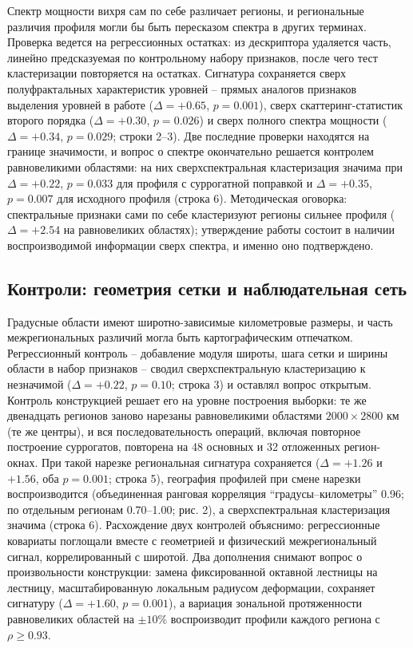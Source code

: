 \documentclass[12pt,a4paper]{article}
\begin{document}
Спектр мощности вихря сам по себе различает регионы, и региональные различия профиля могли бы быть пересказом спектра в других терминах. Проверка ведется на регрессионных остатках: из дескриптора удаляется часть, линейно предсказуемая по контрольному набору признаков, после чего тест кластеризации повторяется на остатках. Сигнатура сохраняется сверх полуфрактальных характеристик уровней -- прямых аналогов признаков выделения уровней в работе \cite{Krenke2019} ($\Delta = +0.65$, $p = 0.001$), сверх скаттеринг-статистик второго порядка \cite{Cheng2024} ($\Delta = +0.30$, $p = 0.026$) и сверх полного спектра мощности ($\Delta = +0.34$, $p = 0.029$; строки 2--3). Две последние проверки находятся на границе значимости, и вопрос о спектре окончательно решается контролем равновеликими областями: на них сверхспектральная кластеризация значима при $\Delta = +0.22$, $p = 0.033$ для профиля с суррогатной поправкой и $\Delta = +0.35$, $p = 0.007$ для исходного профиля (строка 6). Методическая оговорка: спектральные признаки сами по себе кластеризуют регионы сильнее профиля ($\Delta = +2.54$ на равновеликих областях); утверждение работы состоит в наличии воспроизводимой информации сверх спектра, и именно оно подтверждено.

\subsection{Контроли: геометрия сетки и наблюдательная сеть}

Градусные области имеют широтно-зависимые километровые размеры, и часть межрегиональных различий могла быть картографическим отпечатком. Регрессионный контроль -- добавление модуля широты, шага сетки и ширины области в набор признаков -- сводил сверхспектральную кластеризацию к незначимой ($\Delta = +0.22$, $p = 0.10$; строка 3) и оставлял вопрос открытым. Контроль конструкцией решает его на уровне построения выборки: те же двенадцать регионов заново нарезаны равновеликими областями $2000 \times 2800$ км (те же центры), и вся последовательность операций, включая повторное построение суррогатов, повторена на 48 основных и 32 отложенных регион-окнах. При такой нарезке региональная сигнатура сохраняется ($\Delta = +1.26$ и $+1.56$, оба $p = 0.001$; строка 5), география профилей при смене нарезки воспроизводится (объединенная ранговая корреляция “градусы--километры” 0.96; по отдельным регионам 0.70--1.00; рис. 2), а сверхспектральная кластеризация значима (строка 6). Расхождение двух контролей объяснимо: регрессионные ковариаты поглощали вместе с геометрией и физический межрегиональный сигнал, коррелированный с широтой. Два дополнения снимают вопрос о произвольности конструкции: замена фиксированной октавной лестницы на лестницу, масштабированную локальным радиусом деформации, сохраняет сигнатуру ($\Delta = +1.60$, $p = 0.001$), а вариация зональной протяженности равновеликих областей на $\pm10\%$ воспроизводит профили каждого региона с $\rho \geq 0.93$.
\end{document}
